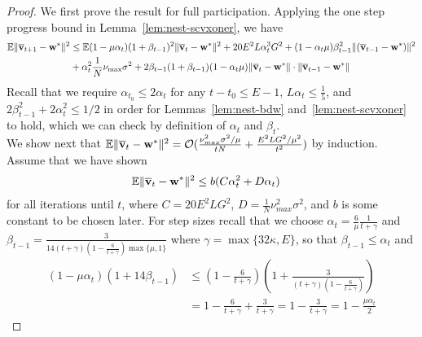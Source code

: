 \begin{proof}
We first prove the result for full participation. Applying the one step progress bound in Lemma~\ref{lem:nest-scvxoner}, we have
\begin{align*}
\mathbb{E}\|{\overline{\mathbf{v}}}_{t+1}-{\mathbf{w}}^{\ast}\|^{2} & \leq\mathbb{E}(1-\mu\alpha_{t})(1+\beta_{t-1})^{2}\|{\overline{\mathbf{v}}}_{t}-{\mathbf{w}}^{\ast}\|^{2}+20E^{2}L\alpha_{t}^{3}G^{2}+(1-\alpha_{t}\mu)\beta_{t-1}^{2}\|({\overline{\mathbf{v}}}_{t-1}-{\mathbf{w}}^{\ast})\|^{2}\\
& +\alpha_{t}^{2}\frac{1}{N}\nu_{\max}\sigma^{2}+2\beta_{t-1}(1+\beta_{t-1})(1-\alpha_{t}\mu)\|{\overline{\mathbf{v}}}_{t}-{\mathbf{w}}^{\ast}\|\cdot\|{\overline{\mathbf{v}}}_{t-1}-{\mathbf{w}}^{\ast}\|
\end{align*}
Recall that we require $\alpha_{t_{0}}\leq2\alpha_{t}$ for any
$t-t_{0}\leq E-1$, $L\alpha_{t}\leq\frac{1}{5}$, and $2\beta_{t-1}^{2}+2\alpha_{t}^{2}\leq1/2$ in order for Lemmas~\ref{lem:nest-bdw} and~\ref{lem:nest-scvxoner} to hold,
which we can check by definition of $\alpha_{t}$ and
$\beta_{t}$.\\
 We show next that $\mathbb{E}\|{\overline{\mathbf{v}}}_{t}-{\mathbf{w}}^{\ast}\|^{2}=\mathcal{O}(\frac{\nu_{max}^{2}\sigma^{2}/\mu}{tN}+\frac{E^{2}LG^{2}/\mu^2}{t^{2}})$ 
by induction. Assume that we have shown 
\begin{align*}
\mathbb{E}\|{\overline{\mathbf{v}}}_{t}-{\mathbf{w}}^{\ast}\|^{2} & \leq b(C\alpha_{t}^{2}+D\alpha_{t})
\end{align*}
for all iterations until $t$, where $C=20E^{2}LG^{2}$, $D=\frac{1}{N}\nu_{max}^{2}\sigma^{2}$,
and $b$ is some constant to be chosen later. For step sizes recall that we choose $\alpha_{t}=\frac{6}{\mu}\frac{1}{t+\gamma}$
and $\beta_{t-1}=\frac{3}{14(t+\gamma)(1-\frac{6}{t+\gamma})\max\{\mu,1\}}$
where $\gamma=\max\{32\kappa,E\}$, so that $\beta_{t-1}\leq\alpha_{t}$
and 
\begin{align*}
(1-\mu\alpha_{t})(1+14\beta_{t-1}) & \leq(1-\frac{6}{t+\gamma})(1+\frac{3}{(t+\gamma)(1-\frac{6}{t+\gamma})})\\
& =1-\frac{6}{t+\gamma}+\frac{3}{t+\gamma}=1-\frac{3}{t+\gamma}=1-\frac{\mu\alpha_{t}}{2}
\end{align*}


\end{proof}
